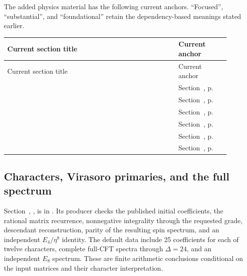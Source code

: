 The added physics material has the following current anchors.
``Focused'', ``substantial'', and ``foundational'' retain the
dependency-based meanings stated earlier.

\begin{longtable}{@{}P{0.70\linewidth}P{0.21\linewidth}@{}}
\toprule
Current section title & Current anchor\\
\midrule\endfirsthead
\toprule Current section title & Current anchor\\
\midrule\endhead\bottomrule\endfoot
{}
& Section~, p.~\\
& Section~, p.~\\
& Section~, p.~\\
& Section~, p.~\\
& Section~, p.~\\
& Section~, p.~\\
\end{longtable}

\subsection{Characters, Virasoro primaries, and the full spectrum}

Section~,
\emph{}, is in
. Its producer
 checks the published initial coefficients,
the rational matrix recurrence, nonnegative integrality through the
requested grade, descendant reconstruction, parity of the resulting
spin spectrum, and an independent $E_4/\eta^8$ identity. The default
data include 25 coefficients for each of twelve characters, complete
full-CFT spectra through $\Delta=24$, and an independent $E_8$ spectrum.
These are finite arithmetic conclusions conditional on the input
matrices and their character interpretation.

